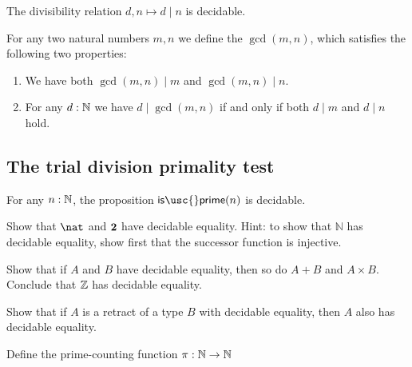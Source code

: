 \begin{lem}
  The divisibility relation $d,n\mapsto d\mid n$ is decidable.
\end{lem}

\begin{defn}
  For any two natural numbers $m,n$ we define the  $\gcd(m,n)$, which satisfies the following two properties:
  \begin{enumerate}
  \item We have both $\gcd(m,n)\mid m$ and $\gcd(m,n)\mid n$.
  \item For any $d:\mathbb{N}$ we have $d\mid \gcd(m,n)$ if and only if both $d\mid m$ and $d\mid n$ hold.
  \end{enumerate}
\end{defn}

\subsection{The trial division primality test}

\begin{thm}
  For any $n:\mathbb{N}$, the proposition $\mathsf{is\usc{}prime}(n)$ is decidable.
\end{thm}


\begin{exercises}
\item
  \begin{subexenum}
  \item Show that $\nat$ and $\mathbf{2}$ have decidable equality. Hint: to show that $\mathbb{N}$ has decidable equality, show first that the successor function is injective.
  \item Show that if $A$ and $B$ have decidable equality, then so do $A+B$ and $A\times B$. Conclude that $\mathbb{Z}$ has decidable equality.
  \item Show that if $A$ is a retract of a type $B$ with decidable equality, then $A$ also has decidable equality.
  \end{subexenum}
\item Define the prime-counting function $\pi:\mathbb{N}\to\mathbb{N}$
\end{exercises}
